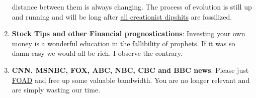 \begin{enumerate}
  distance between them is always changing. The process of evolution is
  still up and running and will be long after
  \href{http://creationistidiocy.blogspot.com/2009/02/morons-of-month-holy-trinity-of-stupid.html}{all
  creationist dipshits} are fossilized.
\item
  \textbf{Stock Tips and other Financial prognostications}: Investing
  your own money is a wonderful education in the fallibility of
  prophets. If it was so damn easy we would all be rich. I observe the
  contrary.
\item
  \textbf{CNN. MSNBC, FOX, ABC, NBC, CBC and BBC news}: Please just
  \href{http://www.urbandictionary.com/define.php?term=F.O.A.D.}{FOAD}
  and free up some valuable bandwidth. You are no longer relevant and
  are simply wasting our time.
\end{enumerate}



%